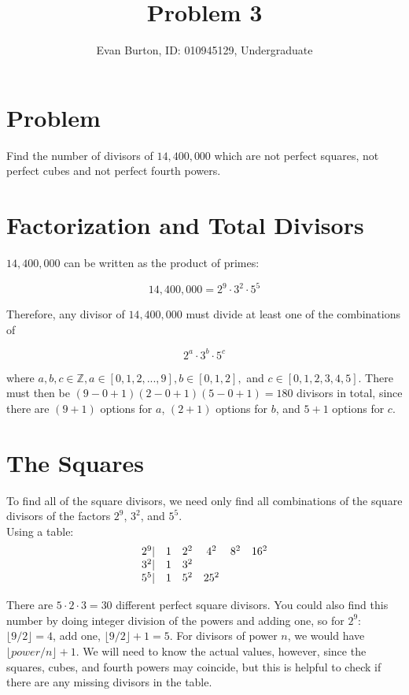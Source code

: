 \documentclass[]{article}
\title{Problem 3}
\author{Evan Burton, ID: 010945129, Undergraduate}
\begin{document}
\maketitle

\section{Problem}
 Find the number of divisors of $14,400,000$ which are not perfect squares, not perfect cubes and not perfect fourth powers. 

\section{Factorization and Total Divisors}
$14,400,000$ can be written as the product of primes:

$$14,400,000=2^9\cdot 3^2\cdot 5^5$$

Therefore, any divisor of $14,400,000$ must divide at least one of the combinations of

$$2^a\cdot 3^b\cdot 5^c$$

where $a,b,c \in \mathbb{Z}, a \in [0, 1, 2, ..., 9], b \in [0, 1, 2], $ and $c \in [0, 1, 2, 3, 4, 5 ]$. There must then be $(9-0+1)(2-0+1)(5-0+1) = 180$ divisors in total, since there are $(9+1)$ options for $a$, $(2+1)$ options for $b$, and $5+1$ options for $c$.

\section{The Squares}
To find all of the square divisors, we need only find all combinations of the square divisors of the factors $2^9$, $3^2$, and $5^5$.\\

Using a table:\\
$$
\begin{array}{cccccc}
	2^9 \vert & 1 & 2^2 & 4^2 & 8^2 & 16^2 \\ 
	3^2 \vert & 1 & 3^2 & \space & \space & \space \\ 
	5^5 \vert & 1 & 5^2 & 25^2 &  \space &\space 
\end{array} 
$$

There are $5\cdot 2 \cdot 3 = 30$ different  perfect square divisors. You could also find this number by doing integer division of the powers and adding one, so for $2^9$: $\lfloor 9/2 \rfloor = 4$, add one, $\lfloor 9/2 \rfloor + 1 = 5 $. For divisors of power $n$, we would have $\lfloor power/n\rfloor + 1$. We will need to know the actual values, however, since the squares, cubes, and fourth powers may coincide, but this is helpful to check if there are any missing divisors in the table.
\end{document}
